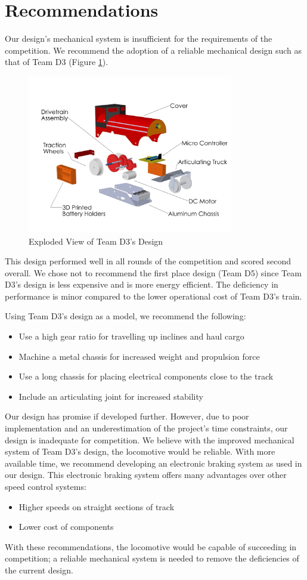 \documentclass[class=../report, crop=false]{standalone}
\begin{document}
\section{Recommendations}

Our design’s mechanical system is insufficient for the requirements of the competition.
We recommend the adoption of a reliable mechanical design such as that of Team D3 (Figure \ref{fig:d3explode}).

\begin{figure}[H]
	\centering
	\includegraphics[width=0.8\textwidth]{../res/img/d3explode}
	\caption{Exploded View of Team D3's Design}
	\label{fig:d3explode}
\end{figure}

This design performed well in all rounds of the competition and scored second overall.
We chose not to recommend the first place design (Team D5)  since Team D3’s design is less expensive and is more energy efficient.
The deficiency in performance is minor compared to the lower operational cost of Team D3’s train.

Using Team D3’s design as a model, we recommend the following:
\begin{itemize}
	\item Use a high gear ratio for travelling up inclines and haul cargo
	\item Machine a metal chassis for increased weight and propulsion force
	\item Use a long chassis for placing electrical components close to the track
	\item Include an articulating joint for increased stability
\end{itemize}

Our design has promise if developed further.
However, due to poor implementation and an underestimation of the project’s time constraints, our design is inadequate for competition.
We believe with the improved mechanical system of Team D3’s design, the locomotive would be reliable.
With more available time, we recommend developing an electronic braking system as used in our design.
This electronic braking system offers many advantages over other speed control systems:
\begin{itemize}
	\item Higher speeds on straight sections of track
	\item Lower cost of components
\end{itemize}

With these recommendations, the locomotive would be capable of succeeding in competition; a reliable mechanical system is needed to remove the deficiencies of the current design.
\end{document}
